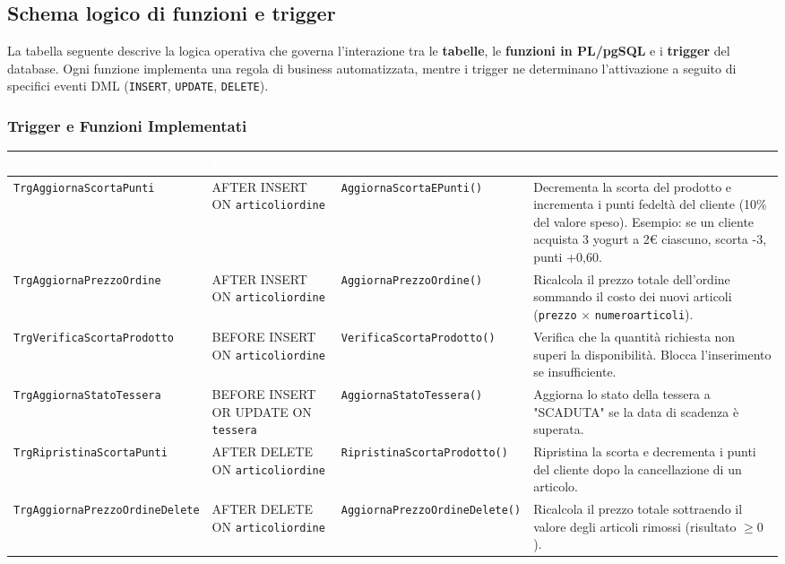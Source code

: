 \documentclass[a4paper,12pt]{article}
\renewcommand{\arraystretch}{1.2} %
\begin{document}
\newpage
\subsection{Schema logico di funzioni e trigger}

La tabella seguente descrive la logica operativa che governa l'interazione tra le \textbf{tabelle}, le \textbf{funzioni in PL/pgSQL} e i \textbf{trigger} del database.  
Ogni funzione implementa una regola di business automatizzata, mentre i trigger ne determinano l'attivazione a seguito di specifici eventi DML (\texttt{INSERT}, \texttt{UPDATE}, \texttt{DELETE}).

\vspace{0.5em}

\subsubsection*{Trigger e Funzioni Implementati}

\renewcommand{\arraystretch}{1.35}
{\scriptsize
\begin{tabularx}{\textwidth}{|p{2.2cm}|p{2.6cm}|p{2.2cm}|X|}
\hline
\rowcolor{myblue}
\textcolor{white}{\textbf{Trigger}} &
\textcolor{white}{\textbf{Evento}} &
\textcolor{white}{\textbf{Funzione}} &
\textcolor{white}{\textbf{Descrizione}} \\
\hline
\rowcolor{mygray}
\texttt{TrgAggiorna\-Scorta\-Punti} &
AFTER INSERT ON \texttt{articoliordine} &
\texttt{Aggiorna\-Scorta\-EPunti()} &
Decrementa la scorta del prodotto e incrementa i punti fedeltà del cliente (10\% del valore speso). Esempio: se un cliente acquista 3 yogurt a 2€ ciascuno, scorta -3, punti +0,60. \\
\hline
\texttt{TrgAggiorna\-Prezzo\-Ordine} &
AFTER INSERT ON \texttt{articoliordine} &
\texttt{Aggiorna\-Prezzo\-Ordine()} &
Ricalcola il prezzo totale dell'ordine sommando il costo dei nuovi articoli (\texttt{prezzo} $\times$ \texttt{numeroarticoli}). \\
\hline
\rowcolor{mygray}
\texttt{TrgVerifica\-Scorta\-Prodotto} &
BEFORE INSERT ON \texttt{articoliordine} &
\texttt{Verifica\-Scorta\-Prodotto()} &
Verifica che la quantità richiesta non superi la disponibilità. Blocca l'inserimento se insufficiente. \\
\hline
\texttt{TrgAggiorna\-Stato\-Tessera} &
BEFORE INSERT OR UPDATE ON \texttt{tessera} &
\texttt{Aggiorna\-Stato\-Tessera()} &
Aggiorna lo stato della tessera a "SCADUTA" se la data di scadenza è superata. \\
\hline
\rowcolor{mygray}
\texttt{TrgRipristina\-Scorta\-Punti} &
AFTER DELETE ON \texttt{articoliordine} &
\texttt{Ripristina\-Scorta\-Prodotto()} &
Ripristina la scorta e decrementa i punti del cliente dopo la cancellazione di un articolo. \\
\hline
\texttt{TrgAggiorna\-Prezzo\-Ordine\-Delete} &
AFTER DELETE ON \texttt{articoliordine} &
\texttt{Aggiorna\-Prezzo\-Ordine\-Delete()} &
Ricalcola il prezzo totale sottraendo il valore degli articoli rimossi (risultato $\geq 0$). \\
\hline
\end{tabularx}
}
\end{document}

